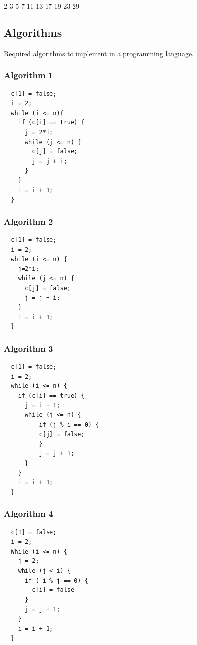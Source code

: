 \documentclass[a4paper, 12pt]{article}
\begin{document}
\begin{center}
  2  3     5     7           11    13          17    19          23                29
\end{center}

\newpage

\subsection{Algorithms}

Required algorithms to implement in a programming language.

\begin{multicols}{2}

\subsubsection{Algorithm 1}

\begin{lstlisting}
  c[1] = false;
  i = 2;
  while (i <= n){
    if (c[i] == true) {
      j = 2*i;
      while (j <= n) {
        c[j] = false;
        j = j + i;
      }
    }
    i = i + 1;
  }
\end{lstlisting}

\subsubsection{Algorithm 2}

\begin{lstlisting}
  c[1] = false;
  i = 2;
  while (i <= n) {
    j=2*i;
    while (j <= n) {
      c[j] = false;
      j = j + i;
    }
    i = i + 1;
  }
\end{lstlisting}

\hfill \break

\subsubsection{Algorithm 3}

\begin{lstlisting}
  c[1] = false;
  i = 2;
  while (i <= n) {
    if (c[i] == true) {
      j = i + 1;
      while (j <= n) {
          if (j % i == 0) {
          c[j] = false;
          }
          j = j + 1;
      }
    }
    i = i + 1;
  }
\end{lstlisting}

\subsubsection{Algorithm 4}

\begin{lstlisting}
  c[1] = false;
  i = 2;
  While (i <= n) {
    j = 2;
    while (j < i) {
      if ( i % j == 0) {
        c[i] = false
      }
      j = j + 1;
    }
    i = i + 1;
  }
\end{lstlisting}
\end{multicols}
\end{document}

